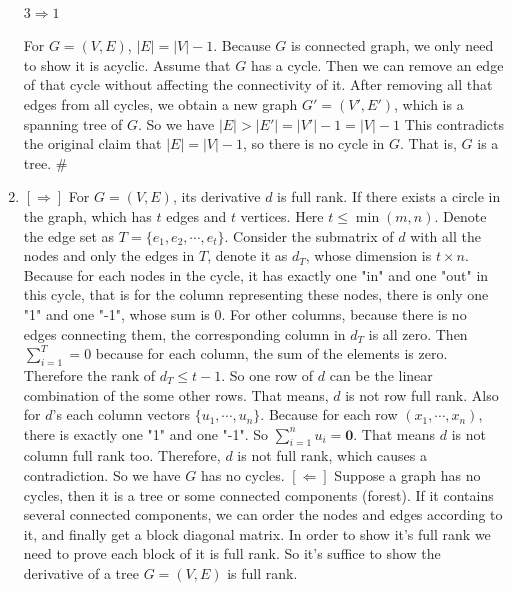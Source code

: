 \documentclass[twoside,11pt]{homework}
\begin{document}
\begin{enumerate}
    \paragraph{$3 \Rightarrow 1$}For $G = (V,E)$, $|E| = |V|-1$. Because $G$ is connected graph, we only need to show it is acyclic. Assume that $G$ has a cycle. Then we can remove an edge of that cycle without affecting the connectivity of it. After removing all that edges from all cycles, we obtain a new graph $G' = (V', E')$, which is a spanning tree of $G$. So we have
      $|E| > |E'| = |V'|-1 = |V|-1$
    This contradicts the original claim that $|E| =|V|-1$, so there is no cycle in $G$. That is, $G$ is a tree. \#
    
    \item
    $[\Rightarrow] $
    For $G=(V,E)$, its derivative $d$ is full rank.
    If there exists a circle in the graph, which has $t$ edges and $t$ vertices. Here $t \leq \min(m,n)$. Denote the edge set as $T = \{e_1, e_2, \cdots, e_t\}$. 
    Consider the submatrix of $d$ with all the nodes and only the edges in $T$, denote it as $d_T$, whose dimension is $t \times n$. Because for each nodes in the cycle, it has exactly one "in" and one "out" in this cycle, that is for the column representing these nodes, there is only one "1" and one "-1", whose sum is 0. For other columns, because there is no edges connecting them, the corresponding column in $d_T$ is all zero. Then $\sum_{i=1}^T=0$ because for each column, the sum of the elements is zero. Therefore the rank of $d_T \leq t-1$. So one row of $d$ can be the linear combination of the some other rows. That means, $d$ is not row full rank.
    \newline\newline
    Also for $d$'s each column vectors $\{u_1,\cdots,u_n\}$. Because for each row $(x_1,\cdots,x_n)$, there is exactly one "1" and one "-1". So $\sum_{i=1}^n u_i=\textbf{0}$. That means $d$ is not column full rank too. Therefore, $d$ is not full rank, which causes a contradiction. So we have $G$ has no cycles.
    \newline\newline\newline
    $[\Leftarrow]$ Suppose a graph has no cycles, then it is a tree or some connected components (forest). If it contains several connected components, we can order the nodes and edges according to it, and finally get a block diagonal matrix. In order to show it's full rank we need to prove each block of it is full rank. So it's suffice to show the derivative of a tree $G=(V,E)$ is full rank.
    

\end{enumerate}
\end{document}
